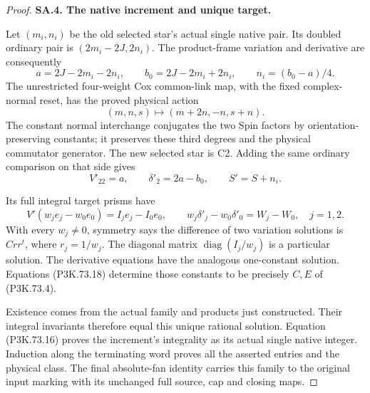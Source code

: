 \begin{proof}
\par\medskip\noindent\textbf{SA.4. The native increment and unique target.}\par\nopagebreak[4]
Let \((m_i,n_i)\) be the old selected star's actual single
native pair. Its doubled ordinary pair is
\((2m_i-2J,2n_i)\). The product-frame variation and derivative
are consequently
\[
 a=2J-2m_i-2n_i,\qquad
 b_0=2J-2m_i+2n_i,\qquad n_i=(b_0-a)/4.
 \tag{P3K.73.16}
\]
The unrestricted four-weight Cox common-link map, with the
fixed complex-normal reset, has the proved physical action
\[
 (m,n,s)\longmapsto(m+2n,-n,s+n).
 \tag{P3K.73.17}
\]
The constant normal interchange conjugates the two Spin
factors by orientation-preserving constants; it preserves
these third degrees and the physical commutator generator.
The new selected star is C2. Adding the same ordinary
comparison on that side gives
\[
 V'_{22}=a,\qquad\delta'_2=2a-b_0,\qquad S'=S+n_i.
 \tag{P3K.73.18}
\]

Its full integral target prisms have
\[
 V'(w_je_j-w_0e_0)=I_je_j-I_0e_0,\qquad
 w_j\delta'_j-w_0\delta'_0=W_j-W_0,\quad j=1,2.
 \tag{P3K.73.19}
\]
With every \(w_j\ne0\), symmetry says the difference of two
variation solutions is \(Crr^t\), where \(r_j=1/w_j\).
The diagonal matrix \(\operatorname{diag}(I_j/w_j)\) is a
particular solution. The derivative equations have the analogous
one-constant solution. Equations (P3K.73.18) determine those
constants to be precisely \(C,E\) of (P3K.73.4).

Existence comes from the actual family and products just
constructed. Their integral invariants therefore equal this
unique rational solution. Equation (P3K.73.16) proves the
increment's integrality as its actual single native integer.
Induction along the terminating word proves all the asserted
entries and the physical class. The final absolute-fan identity
carries this family to the original input marking with its
unchanged full source, cap and closing maps.


\end{proof}

